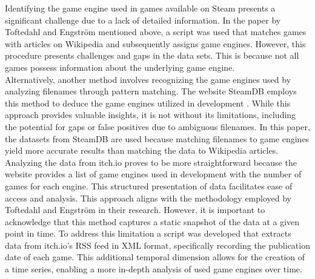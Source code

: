 Identifying the game engine used in games available on Steam presents a significant challenge due to a lack of detailed information.
In the paper by Toftedahl and Engström mentioned above, a script was used that matches games with articles on Wikipedia and subsequently assigns game engines.
However, this procedure presents challenges and gaps in the data sets.
This is because not all games possess information about the underlying game engine. \\

Alternatively, another method involves recognizing the game engines used by analyzing filenames through pattern matching.
The website SteamDB employs this method to deduce the game engines utilized in development \cite{steamdb-tech}.
While this approach provides valuable insights, it is not without its limitations, including the potential for gaps or false positives due to ambiguous filenames.
In this paper, the datasets from SteamDB are used because matching filenames to game engines yield more accurate results than matching the data to Wikipedia articles. \\

Analyzing the data from itch.io proves to be more straightforward because the website provides a list of game engines used in development with the number of games for each engine. %
This structured presentation of data facilitates ease of access and analysis.
This approach aligns with the methodology employed by Toftedahl and Engström in their research.
However, it is important to acknowledge that this method captures a static snapshot of the data at a given point in time.
To address this limitation a script was developed that extracts data from itch.io's RSS feed in XML format, specifically recording the publication date of each game.
This additional temporal dimension allows for the creation of a time series, enabling a more in-depth analysis of used game engines over time. \\

